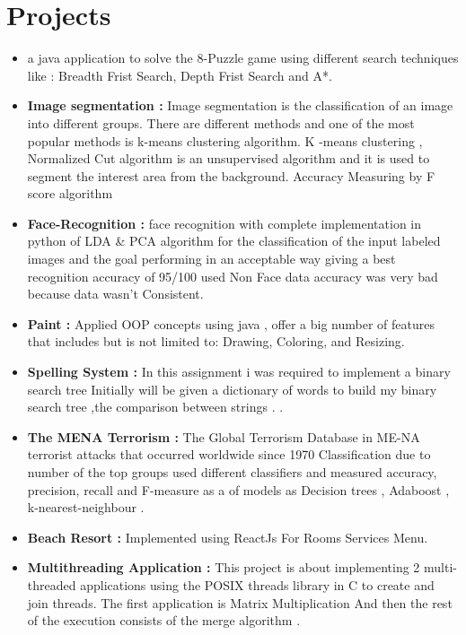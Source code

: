 \documentclass[letterpaper,11pt]{article}
\newcommand{\resumeItem}[2]{
  \item\small{
    \textbf{#1}{: #2 \vspace{-2pt}}
  }
}
\newcommand{\resumeSubItem}[2]{\resumeItem{#1}{#2}\vspace{-4pt}}
\newcommand{\resumeSubHeadingListStart}{\begin{itemize}[leftmargin=*]}
\newcommand{\resumeSubHeadingListEnd}{\end{itemize}}
\begin{document}
\section{Projects}
  \resumeSubHeadingListStart
    \item{\textbf{}}
      {a java application to solve the 8-Puzzle game using different search techniques like : Breadth Frist Search, Depth Frist Search and A*.}
    \item{\textbf{Image segmentation  :}}
      {Image segmentation is the classification of an image into different groups. There are different methods and one of the most popular methods is k-means clustering algorithm. K -means clustering , Normalized Cut algorithm is an unsupervised algorithm and it is used to segment the interest area from the background. Accuracy Measuring by F score algorithm}
    \item{\textbf{Face-Recognition :}}
      { face recognition with complete implementation in python of LDA & PCA  algorithm for the classification of the input labeled images and the goal performing in an acceptable way giving a best recognition accuracy of 95/100 used Non Face data accuracy was very bad because data wasn't Consistent.}
    \item{\textbf{Paint :}}
      {Applied OOP concepts using java , offer a big number of features that includes but is not limited to:
Drawing, Coloring, and Resizing.} 
\item{\textbf{Spelling System :}}
      {In this assignment i was  required to implement a binary search tree Initially
 will be given a dictionary of words to build my binary search tree ,the comparison between
strings .
.}\item{\textbf{The MENA Terrorism  :}}
      {The Global Terrorism Database  in ME-NA  terrorist attacks that occurred worldwide since 1970 Classification due to number of the top groups used different classifiers and measured  accuracy, precision, recall and F-measure as a of  models as Decision trees , Adaboost , k-nearest-neighbour .}\item{\textbf{Beach Resort :}}
      {Implemented using ReactJs For Rooms Services Menu.}
      \item{\textbf{Multithreading Application :}}
      {This project is about implementing 2 multi-threaded applications using the POSIX threads library in C to create and join threads. The first application is Matrix Multiplication  And then the rest of the execution consists of the merge algorithm .}
  \resumeSubHeadingListEnd
\end{document}
